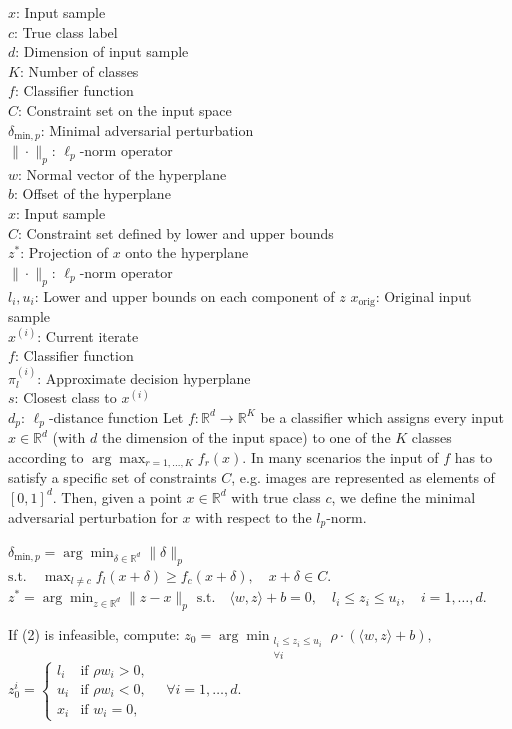 
$x$: Input sample \\
$c$: True class label \\
$d$: Dimension of input sample \\
$K$: Number of classes \\
$f$: Classifier function \\
$C$: Constraint set on the input space \\
$\delta_{\text{min},p}$: Minimal adversarial perturbation \\
$\|\cdot\|_p$: $\ell_p$-norm operator\\
$w$: Normal vector of the hyperplane \\
$b$: Offset of the hyperplane \\
$x$: Input sample \\
$C$: Constraint set defined by lower and upper bounds \\
$z^*$: Projection of $x$ onto the hyperplane \\
$\|\cdot\|_p$: $\ell_p$-norm operator \\
$l_i, u_i$: Lower and upper bounds on each component of $z$
$x_{\text{orig}}$: Original input sample \\
$x^{(i)}$: Current iterate \\
$f$: Classifier function \\
$\pi_l^{(i)}$: Approximate decision hyperplane \\
$s$: Closest class to $x^{(i)}$ \\
$d_p$: $\ell_p$-distance function
Let $f : \mathbb{R}^d \to \mathbb{R}^K$ be a classifier which assigns every input $x \in \mathbb{R}^d$ (with $d$ the dimension of the input space) to one of the $K$ classes according to $\arg \max_{r=1,...,K} f_r(x)$. In many scenarios the input of $f$ has to satisfy a specific set of constraints $C$, e.g. images are represented as elements of $[0, 1]^d$. Then, given a point $x \in \mathbb{R}^d$ with true class $c$, we define the minimal adversarial perturbation for $x$ with respect to the $l_p$-norm.

$\delta_{\text{min},p} = \arg \min_{\delta \in \mathbb{R}^d} \|\delta\|_p$
$\text{s.t.} \quad \max_{l \neq c} f_l(x + \delta) \geq f_c(x + \delta), \quad x + \delta \in C.$
$z^* = \arg \min_{z \in \mathbb{R}^d} \|z - x\|_p$
$\text{s.t.} \quad \langle w, z \rangle + b = 0, \quad l_i \leq z_i \leq u_i, \quad i = 1, \dots, d.$

If (2) is infeasible, compute:
$z_0 = \arg \min_{\substack{l_i \leq z_i \leq u_i \\ \forall i}} \rho \cdot (\langle w, z \rangle + b),$
$z_0^i = \begin{cases} 
l_i & \text{if } \rho w_i > 0, \\
u_i & \text{if } \rho w_i < 0, \\
x_i & \text{if } w_i = 0,
\end{cases}
\quad \forall i = 1, \dots, d.$

